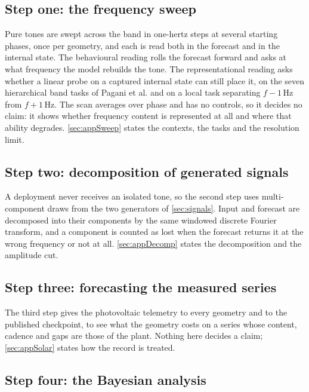 \subsection{Step one: the frequency sweep}

Pure tones are swept across the band in one-hertz steps at several starting phases, once per geometry, and each is read both in the forecast and in the internal state. The behavioural reading rolls the forecast forward and asks at what frequency the model rebuilds the tone. The representational reading asks whether a linear probe on a captured internal state can still place it, on the seven hierarchical band tasks of Pagani et al.\autocite{paganiPreliminaryInsightsChronos2026} and on a local task separating $f-1$\,Hz from $f+1$\,Hz. The scan averages over phase and has no controls, so it decides no claim: it shows whether frequency content is represented at all and where that ability degrades\@. \autoref{sec:appSweep} states the contexts, the tasks and the resolution limit.

\subsection{Step two: decomposition of generated signals}

A deployment never receives an isolated tone, so the second step uses multi-component draws from the two generators of \autoref{sec:signals}. Input and forecast are decomposed into their components by the same windowed discrete Fourier transform, and a component is counted as lost when the forecast returns it at the wrong frequency or not at all\@. \autoref{sec:appDecomp} states the decomposition and the amplitude cut.

\subsection{Step three: forecasting the measured series}

The third step gives the photovoltaic telemetry to every geometry and to the published checkpoint, to see what the geometry costs on a series whose content, cadence and gaps are those of the plant. Nothing here decides a claim; \autoref{sec:appSolar} states how the record is treated.

\subsection{Step four: the Bayesian analysis}

